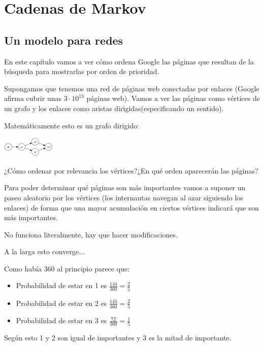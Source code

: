 \chapter{Cadenas de Markov}

\section{Un modelo para redes}
En este capítulo vamos a ver cómo ordena Google las páginas que resultan de la búsqueda para mostrarlas por orden de prioridad.

Supongamos que tenemos una red de páginas web conectadas por enlaces (Google afirma cubrir unas $3\cdot 10^{13}$ páginas web). Vamos a ver las páginas como vértices de un grafo y los enlaces como aristas dirigidas(especificando un sentido).

Matemáticamente esto es un grafo dirigido:
\begin{center}
\includegraphics{tex/ejemplo_dibujo.png}
\end{center}
¿Cómo ordenar por relevancia los vértices?¿En qué orden aparecerán las páginas?


Para poder determinar qué páginas son más importantes vamos a suponer un paseo aleatorio por los vértices (los internautas navegan al azar siguiendo los enlaces) de forma que una mayor acumulación en ciertos vértices indicará que son más importantes.


\obs No funciona literalmente, hay que hacer modificaciones.

A la larga esto converge...
\begin{center}
	\centering
\end{center}




Como había 360 al principio parece que:


\begin{itemize}
	\item Probabilidad de estar en 1 es $\frac{144}{360} = \frac{2}{5}$
	\item Probabilidad de estar en 2 es $\frac{144}{360} = \frac{2}{5}$
	\item Probabilidad de estar en 3 es $\frac{72}{360} = \frac{1}{5}$
\end{itemize}
	Según esto 1 y 2 son igual de importantes y 3 es la mitad de importante.

